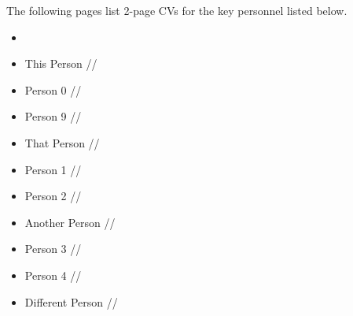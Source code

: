 
The following pages list 2-page CVs for the key personnel listed below.

\begin{itemize} \zapspace
    \item{\Investigator}
    \item{This Person} //
    \item{Person 0} //
    \item{Person 9} //
    \item{That Person} //
    \item{Person 1} //
    \item{Person 2} //
    \item{Another Person} //
    \item{Person 3} //
    \item{Person 4} //
    \item{Different Person} //
\end{itemize}

\newpage

%

